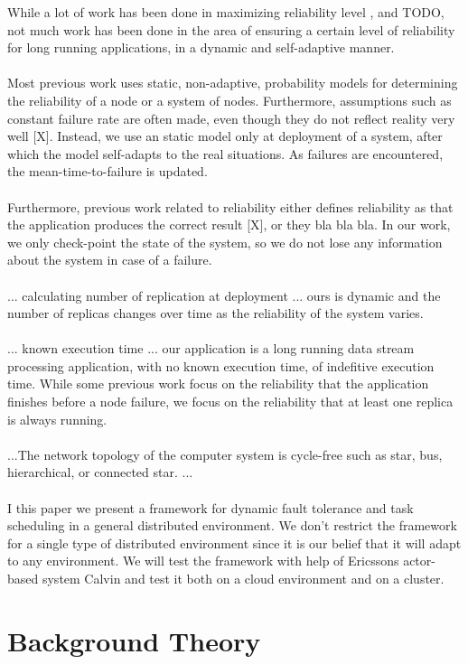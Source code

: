 \documentclass{cslthse-msc}
\begin{document}
While a lot of work has been done in maximizing reliability level \cite{X}, and TODO, not much work has been done in the area of ensuring a certain level of reliability for long running applications, in a dynamic and self-adaptive manner.
\\\\
Most previous work uses static, non-adaptive, probability models for determining the reliability of a node or a system of nodes. Furthermore, assumptions such as constant failure rate are often made, even though they do not reflect reality very well [X]. Instead, we use an static model only at deployment of a system, after which the model self-adapts to the real situations. As failures are encountered, the mean-time-to-failure is updated.
\\\\
Furthermore, previous work related to reliability either defines reliability as that the application produces the correct result [X], or they bla bla bla. In our work, we only check-point the state of the system, so we do not lose any information about the system in case of a failure. 
\\\\
... calculating number of replication at deployment ... ours is dynamic and the number of replicas changes over time as the reliability of the system varies.
\\\\
... known execution time ... our application is a long running data stream processing application, with no known execution time, of indefitive execution time. While some previous work focus on the reliability that the application finishes before a node failure, we focus on the reliability that at least one replica is always running.
\\\\
...The network topology of the computer system is cycle-free such as star, bus, hierarchical, or connected star. \cite{taskAllocation}...
\\\\

I this paper we present a framework for dynamic fault tolerance and task scheduling in a general distributed environment. We don't restrict the framework for a single type of distributed environment since it is our belief that it will adapt to any environment. We will test the framework with help of Ericssons actor-based system Calvin and test it both on a cloud environment and on a cluster.

\chapter{Background Theory} \label{ch:background_theory}
\end{document}
